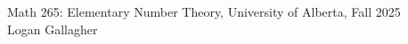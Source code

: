 \documentclass{book}
\begin{document}
\Huge \centering Math 265: Elementary Number Theory, University of Alberta, Fall 2025
\\ \Large Logan Gallagher
\end{document}
